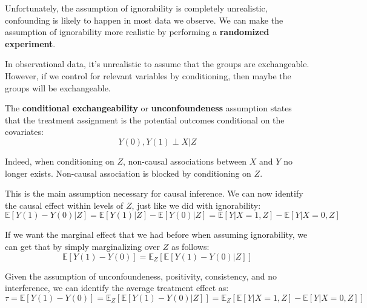 Unfortunately, the assumption of ignorability is completely unrealistic, confounding
is likely to happen in most data we observe. We can make the assumption of ignorability
more realistic by performing a \textbf{randomized experiment}.

In observational data, it's unrealistic to assume that the groups are exchangeable.
However, if we control for relevant variables by conditioning, then maybe the groups
will be exchangeable.

\begin{definition}
    The \textbf{conditional exchangeability} or \textbf{unconfoundeness} assumption
    states that the treatment assignment is the potential outcomes conditional
    on the covariates:
    \begin{equation}
        Y(0), Y(1) \perp X | Z
    \end{equation}
\end{definition}

Indeed, when conditioning on $Z$, non-causal associations between $X$ and $Y$ no
longer exists. Non-causal association is blocked by conditioning on $Z$.

This is the main assumption necessary for causal inference. We can now identify
the causal effect within levels of $Z$, just like we did with ignorability:
\begin{equation}
    \mathbb{E}[Y(1) - Y(0) | Z] = \mathbb{E}[Y(1)| Z] - \mathbb{E}[Y(0)| Z] =
    \mathbb{E}[Y|X = 1, Z] - \mathbb{E}[Y|X = 0, Z]
\end{equation}

If we want the marginal effect that we had before when assuming ignorability, we
can get that by simply marginalizing over $Z$ as follows:
\begin{equation}
    \mathbb{E}[Y(1) - Y(0)] = \mathbb{E}_Z[\mathbb{E}[Y(1) - Y(0) | Z]]
\end{equation}

\begin{definition}
    Given the assumption of unconfoundeness, positivity, consistency, and no interference,
    we can identify the average treatment effect as:
    \begin{equation}
        \tau = \mathbb{E}[Y(1) - Y(0)] = \mathbb{E}_Z[\mathbb{E}[Y(1) - Y(0) | Z]]
        = \mathbb{E}_Z[\mathbb{E}[Y|X = 1, Z] - \mathbb{E}[Y|X = 0, Z]]
    \end{equation}
\end{definition}

